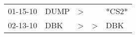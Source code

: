 \begin{supertabular}{lllll}
 01-15-10 &  DUMP &  \textgreater &               &  *CS2* \\
 02-13-10 &   DBK &  \textgreater &  \textgreater &    DBK \\
\end{supertabular}
